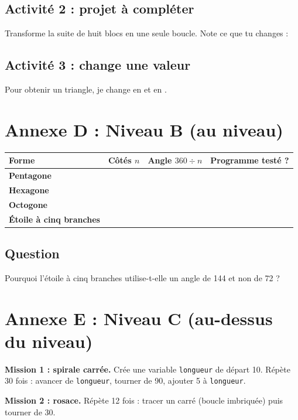\documentclass[11pt,a4paper]{article}
\begin{document}
\subsection*{Activité 2 : projet à compléter}
Transforme la suite de huit blocs en une seule boucle. Note ce que tu changes : \dotfill

\subsection*{Activité 3 : change une valeur}
Pour obtenir un triangle, je change \dotfill{} en \dotfill{} et \dotfill{} en \dotfill.

\newpage
\section*{Annexe D : Niveau B (au niveau)}

\begin{tabularx}{\linewidth}{>{\bfseries}p{3.4cm}Y Y Y}
\toprule
Forme & Côtés $n$ & Angle $360 \div n$ & Programme testé ?\\
\midrule
Pentagone & & & \\
Hexagone & & & \\
Octogone & & & \\
Étoile à cinq branches & & & \\
\bottomrule
\end{tabularx}

\subsection*{Question}
Pourquoi l'étoile à cinq branches utilise-t-elle un angle de 144 et non de 72 ?\\
\lig \lig

\newpage
\section*{Annexe E : Niveau C (au-dessus du niveau)}

\textbf{Mission 1 : spirale carrée.} Crée une variable \texttt{longueur} de départ 10. Répète 30 fois : avancer de \texttt{longueur}, tourner de 90, ajouter 5 à \texttt{longueur}.

\textbf{Mission 2 : rosace.} Répète 12 fois : tracer un carré (boucle imbriquée) puis tourner de 30.
\end{document}
